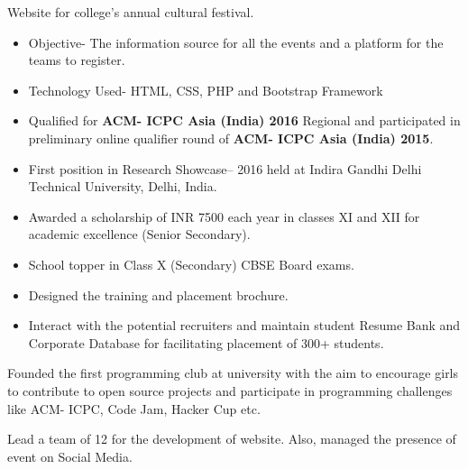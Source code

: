 \documentclass[9.5pt,a4paper]{altacv}
\begin{document}
\divider

Website for college’s annual cultural festival.
\begin{itemize}
\item Objective- The information source for all the events and a platform for the teams to register. 
\item Technology Used- HTML, CSS, PHP and Bootstrap Framework
\end{itemize}


\begin{itemize}
\item Qualified for \textbf{ACM- ICPC Asia (India) 2016} Regional and participated in preliminary online qualifier round of \textbf{ACM- ICPC Asia (India) 2015}.
\item First position in Research Showcase– 2016 held at Indira Gandhi Delhi Technical University, Delhi, India.  
\item Awarded a scholarship of INR 7500  each year in classes XI and XII for academic excellence (Senior Secondary).
\item School topper in Class X (Secondary) CBSE Board exams.
\end{itemize}


\begin{itemize}
\item Designed the training and placement brochure.
\item Interact with the potential recruiters and maintain student Resume Bank and Corporate Database for facilitating placement of 300+ students.
\end{itemize}

Founded the first programming club at university with the aim to encourage girls to contribute to open source projects and participate in programming challenges like ACM- ICPC, Code Jam, Hacker Cup etc.

Lead a team of 12 for the development of website. Also, managed the presence of event on Social Media.
\end{document}
